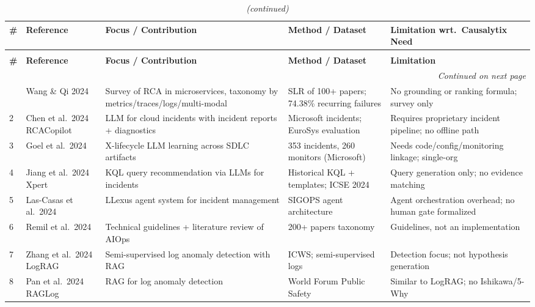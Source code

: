 \documentclass[12pt,a4paper,oneside]{report}
\begin{document}
\begin{landscape}
\begin{longtable}{p{0.6cm} p{3.2cm} p{4.2cm} p{4.2cm} p{5.5cm}}
\caption{Literature survey summary -- 40 papers reviewed for Causalytix} \label{tab:lit}\\
\toprule
\textbf{\#} & \textbf{Reference} & \textbf{Focus / Contribution} & \textbf{Method / Dataset} & \textbf{Limitation wrt.\ Causalytix Need}\\
\midrule
\endfirsthead
\caption[]{\textit{(continued)}}\\
\toprule
\textbf{\#} & \textbf{Reference} & \textbf{Focus / Contribution} & \textbf{Method / Dataset} & \textbf{Limitation}\\
\midrule
\endhead
\midrule
\multicolumn{5}{r}{\textit{Continued on next page}}\\
\endfoot
\bottomrule
\endlastfoot
1 & Wang \& Qi 2024 \cite{wang2024comprehensive} & Survey of RCA in microservices, taxonomy by metrics/traces/logs/multi-modal & SLR of 100+ papers; 74.38\% recurring failures & No grounding or ranking formula; survey only\\
2 & Chen et al.\ 2024 RCACopilot \cite{chen2024rcacopilot} & LLM for cloud incidents with incident reports + diagnostics & Microsoft incidents; EuroSys evaluation & Requires proprietary incident pipeline; no offline path\\
3 & Goel et al.\ 2024 \cite{goel2024xlifecycle} & X-lifecycle LLM learning across SDLC artifacts & 353 incidents, 260 monitors (Microsoft) & Needs code/config/monitoring linkage; single-org\\
4 & Jiang et al.\ 2024 Xpert \cite{jiang2024xpert} & KQL query recommendation via LLMs for incidents & Historical KQL + templates; ICSE 2024 & Query generation only; no evidence matching\\
5 & Las-Casas et al.\ 2024 \cite{lascasas2024llexus} & LLexus agent system for incident management & SIGOPS agent architecture & Agent orchestration overhead; no human gate formalized\\
6 & Remil et al.\ 2024 \cite{remil2024aiops} & Technical guidelines + literature review of AIOps & 200+ papers taxonomy & Guidelines, not an implementation\\
7 & Zhang et al.\ 2024 LogRAG \cite{zhang2024lograg} & Semi-supervised log anomaly detection with RAG & ICWS; semi-supervised logs & Detection focus; not hypothesis generation\\
8 & Pan et al.\ 2024 RAGLog \cite{pan2024raglog} & RAG for log anomaly detection & World Forum Public Safety & Similar to LogRAG; no Ishikawa/5-Why\\

\end{longtable}
\end{landscape}
\end{document}
